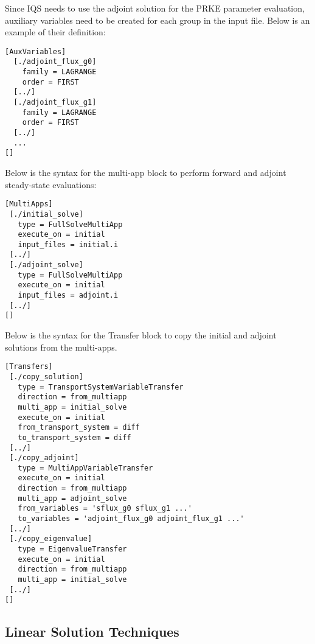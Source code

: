 Since IQS needs to use the adjoint solution for the PRKE parameter evaluation, auxiliary variables need to be created for each group in the input file.  Below is an example of their definition: 
\begin{lstlisting}
[AuxVariables]
  [./adjoint_flux_g0] 
    family = LAGRANGE
    order = FIRST
  [../]
  [./adjoint_flux_g1]
    family = LAGRANGE
    order = FIRST
  [../]
  ...
[]
\end{lstlisting}

Below is the syntax for the multi-app block to perform forward and adjoint steady-state evaluations:
\begin{lstlisting}
[MultiApps]
 [./initial_solve]
   type = FullSolveMultiApp
   execute_on = initial
   input_files = initial.i
 [../]
 [./adjoint_solve]
   type = FullSolveMultiApp
   execute_on = initial
   input_files = adjoint.i
 [../]
[]
\end{lstlisting}

Below is the syntax for the Transfer block to copy the initial and adjoint solutions from the multi-apps.
\begin{lstlisting}
[Transfers]
 [./copy_solution]
   type = TransportSystemVariableTransfer
   direction = from_multiapp
   multi_app = initial_solve
   execute_on = initial
   from_transport_system = diff
   to_transport_system = diff
 [../]
 [./copy_adjoint]
   type = MultiAppVariableTransfer
   execute_on = initial
   direction = from_multiapp
   multi_app = adjoint_solve
   from_variables = 'sflux_g0 sflux_g1 ...'
   to_variables = 'adjoint_flux_g0 adjoint_flux_g1 ...'
 [../]
 [./copy_eigenvalue]
   type = EigenvalueTransfer
   execute_on = initial
   direction = from_multiapp
   multi_app = initial_solve
 [../]
[]
\end{lstlisting}

\subsection{Linear Solution Techniques}

